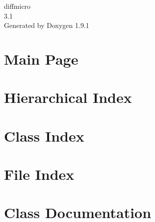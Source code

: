 \let\mypdfximage\pdfximage\def\pdfximage{\immediate\mypdfximage}\documentclass[twoside]{book}
\newcommand{\+}{\discretionary{\mbox{\scriptsize$\hookleftarrow$}}{}{}}
\newcommand{\clearemptydoublepage}{%
  \newpage{\pagestyle{empty}\cleardoublepage}%
}
\begin{document}
\raggedbottom

\hypersetup{pageanchor=false,
             bookmarksnumbered=true,
             pdfencoding=unicode
            }
\begin{titlepage}
\vspace*{7cm}
\begin{center}%
{\Large diffmicro \\[1ex]\large 3.\+1 }\\
\vspace*{1cm}
{\large Generated by Doxygen 1.9.1}\\
\end{center}
\end{titlepage}
\clearemptydoublepage
{}
\tableofcontents
\clearemptydoublepage
{}
\hypersetup{pageanchor=true}

\chapter{Main Page}
\label{index}\hypertarget{index}{}
\chapter{Hierarchical Index}

\chapter{Class Index}

\chapter{File Index}

\chapter{Class Documentation}









































\end{document}
